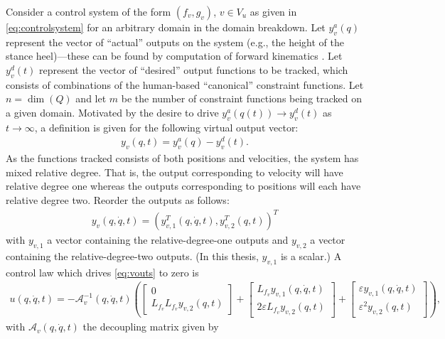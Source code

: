Consider a control system of the form $(f_{v},g_{v})$, $v \in V_{u}$ as given in
\eqref{eq:controlsystem} for an arbitrary domain in the domain breakdown.
%
Let $y^{a}_{v}(q)$ represent the vector of ``actual'' outputs on the system
(e.g., the height of the stance heel)---these can be found by computation of
forward kinematics \cite{Murray1994}.
%
Let $y^{d}_{v}(t)$ represent the vector of ``desired'' output functions to be
tracked, which consists of combinations of the human-based ``canonical''
constraint functions.
%
Let $n = \dim(Q)$ and let $m$ be the number of constraint functions being
tracked on a given domain.
%
Motivated by the desire to drive $y^{a}_{v}(q(t)) \to y^{d}_{v}(t)$ as $t \to
\infty$, a definition is given for the following virtual output vector:
%
\begin{align}
  \label{eq:virtout}
  y_v(q,t) = y^a_v(q) - y^d_v(t).
\end{align}
As the functions tracked consists of both positions and velocities, the system
has mixed relative degree.
%
That is, the output corresponding to velocity will have relative degree one
whereas the outputs corresponding to positions will each have relative degree
two.
%
Reorder the outputs as follows:
\begin{align}
  \label{eq:vouts}
  y_v(q, {\dot q}, t) = (y_{v,1}^T(q, {\dot q}, t),y_{v,2}^T(q, t))^T
\end{align}
with $y_{v,1}$ a vector containing the relative-degree-one outputs and $y_{v,2}$
a vector containing the relative-degree-two outputs.
%
(In this thesis, $y_{v,1}$ is a scalar.)
%
A control law which drives \eqref{eq:vouts} to zero is
\begin{align*}
  u(q, {\dot q}, t) = -\mathcal{A}_{v}^{-1}(q, {\dot q}, t)
  \left(\left[\!\!\begin{array}{c}
      0\\
      L_{f_{v}} L_{f_{v}} y_{v,2}(q, t)
    \end{array}\!\!\right]
  + \left[\!\!\begin{array}{c}
      L_{f_{v}} y_{v,1}(q, {\dot q}, t)\\
      2 \varepsilon L_{f_{v}} y_{v,2}(q, t)
    \end{array}\!\!\right] +
  \left[\!\!\begin{array}{c}
      \varepsilon y_{v,1}(q, {\dot q}, t)\\
      \varepsilon^2 y_{v,2}(q, t)
    \end{array}\!\!\right]\right),
\end{align*}
with $\mathcal{A}_{v}(q, {\dot q},t)$ the decoupling matrix given by
